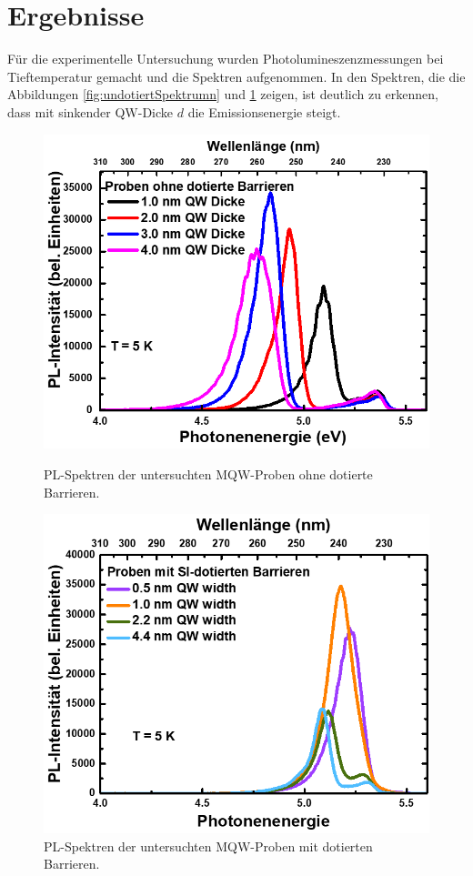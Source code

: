 \section{Ergebnisse}
Für die experimentelle Untersuchung wurden Photolumineszenzmessungen bei Tieftemperatur gemacht und die Spektren aufgenommen.
In den Spektren, die die Abbildungen \ref{fig:undotiertSpektrumn} und \ref{fig:dotiertSpektrumn} zeigen,
ist deutlich zu erkennen, dass mit sinkender QW-Dicke $d$ die Emissionsenergie steigt.
\begin{figure}[H]
  \centering
  \begin{minipage}[t]{0.45\textwidth}
    \centering
    \includegraphics[width=\textwidth]{Bilder/MQWdickenSerie/spektrumUndotiert}
		\caption{PL-Spektren der untersuchten MQW-Proben ohne dotierte Barrieren.}
    \label{fig:undotiertSpektrumn}
  \end{minipage}
	\hfill
  \begin{minipage}[t]{0.45\textwidth}
    \centering
    \includegraphics[width=\linewidth]{Bilder/MQWdickenSerie/spektrumDotiert}
		\caption{PL-Spektren der untersuchten MQW-Proben mit dotierten Barrieren.}
    \label{fig:dotiertSpektrumn}
  \end{minipage}
\end{figure}
